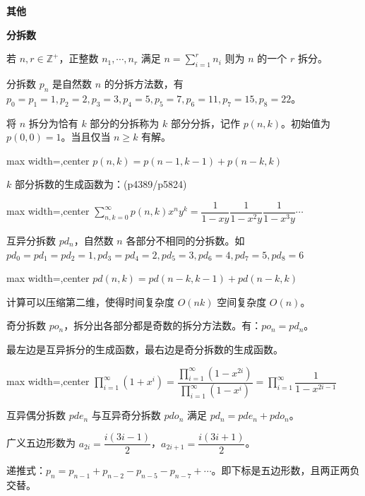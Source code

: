 \documentclass[twocolumn,10pt]{ctexart}
\makeatletter
\newcommand{\hfive}[1]{\par\addvspace{6pt}\@afterindentfalse
  {\noindent\bfseries\normalsize #1}\par\nobreak\vspace{2pt}}
\newcommand{\hsix}[1]{\par\addvspace{4pt}\@afterindentfalse
  {\noindent\bfseries\small #1}\par\nobreak\vspace{1pt}}
\newcommand{\Z}{\mathbb{Z}}
\makeatother
\begin{document}
\inputminted{cpp}{code/p5824_poly_kit.cpp}

\hfive{其他}

\hsix{分拆数}

若 $n,r\in\Z^+$，正整数 $n_1,\cdots,n_r$ 满足 $n=\sum_{i=1}^rn_i$ 则为 $n$ 的一个 $r$ 拆分。

分拆数 $p_n$ 是自然数 $n$ 的分拆方法数，有 $p_0=p_1=1,\allowbreak{}p_2=2,\allowbreak{}p_3=3,\allowbreak{}p_4=5,\allowbreak{}p_5=7,\allowbreak{}p_6=11,\allowbreak{}p_7=15,\allowbreak{}p_8=22$。

将 $n$ 拆分为恰有 $k$ 部分的分拆称为 $k$ 部分分拆，记作 $p(n,k)$。初始值为 $p(0,0)=1$。当且仅当 $n\ge k$ 有解。

\begin{adjustbox}{max width=\linewidth,center}
$p(n,k)=p(n-1,k-1)+p(n-k,k)$
\end{adjustbox}

$k$ 部分拆数的生成函数为：(p4389/p5824)

\begin{adjustbox}{max width=\linewidth,center}
$\sum_{n,k=0}^\infty p(n,k)x^ny^k=\dfrac1{1-xy}\dfrac1{1-x^2y}\dfrac1{1-x^3y}\cdots$
\end{adjustbox}

互异分拆数 $pd_n$，自然数 $n$ 各部分不相同的分拆数。如 $pd_0=pd_1=pd_2=1,\allowbreak{}pd_3=pd_4=2,\allowbreak{}pd_5=3,\allowbreak{}pd_6=4,\allowbreak{}pd_7=5,\allowbreak{}pd_8=6$

\begin{adjustbox}{max width=\linewidth,center}
$pd(n,k)=pd(n-k,k-1)+pd(n-k,k)$
\end{adjustbox}

计算可以压缩第二维，使得时间复杂度 $O(nk)$ 空间复杂度 $O(n)$。

奇分拆数 $po_n$，拆分出各部分都是奇数的拆分方法数。有：$po_n=pd_n$。

最左边是互异拆分的生成函数，最右边是奇分拆数的生成函数。

\begin{adjustbox}{max width=\linewidth,center}
$\prod_{i=1}^\infty(1+x^i)=\dfrac{\prod_{i=1}^\infty(1-x^{2i})}{\prod_{i=1}^\infty(1-x^{i})}=\prod_{i=1}^\infty\dfrac1{1-x^{2i-1}}$
\end{adjustbox}

互异偶分拆数 $pde_n$ 与互异奇分拆数 $pdo_n$ 满足 $pd_n=pde_n+pdo_n$。

广义五边形数为 $a_{2i}=\dfrac{i(3i-1)}2$，$a_{2i+1}=\dfrac{i(3i+1)}2$。

递推式：$p_n=p_{n-1}+p_{n-2}-p_{n-5}-p_{n-7}+\cdots$。即下标是五边形数，且两正两负交替。
\end{document}
